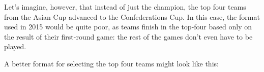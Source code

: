 {    Let's imagine, however, that instead of just the champion, the top four teams from the Asian Cup advanced to the Confederations Cup. In this case, the format used in 2015 would be quite poor, as teams finish in the top-four based only on the result of their first-round game: the rest of the games don't even have to be played.

    A better format for selecting the top four teams might look like this:



}


